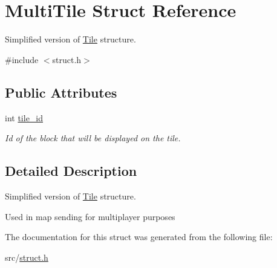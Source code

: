 \hypertarget{struct_multi_tile}{}\section{Multi\+Tile Struct Reference}
\label{struct_multi_tile}


Simplified version of \hyperlink{struct_tile}{Tile} structure.  




{\ttfamily \#include $<$struct.\+h$>$}

\subsection*{Public Attributes}
\begin{DoxyCompactItemize}
\item 
\mbox{\label{struct_multi_tile_a27dcbcfabf1e223ab54b17ce83074f92}} 
int \hyperlink{struct_multi_tile_a27dcbcfabf1e223ab54b17ce83074f92}{tile\+\_\+id}
\begin{DoxyCompactList}\small\item\em Id of the block that will be displayed on the tile. \end{DoxyCompactList}\end{DoxyCompactItemize}


\subsection{Detailed Description}
Simplified version of \hyperlink{struct_tile}{Tile} structure. 

Used in map sending for multiplayer purposes 

The documentation for this struct was generated from the following file\+:\begin{DoxyCompactItemize}
\item 
src/\hyperlink{struct_8h}{struct.\+h}\end{DoxyCompactItemize}

